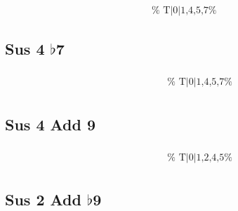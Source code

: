 \documentclass[english]{./gbook}
\begin{document}
\begin{large}
\[\begin{array}{ll}
&
	\text{
	}
\end{array}
\]

\subsection*{Sus 4 $\flat$7}

\[
\begin{array}{ll}
	\begin{array}{c}
		\begin{array}{ccc}
			&%
			&%
		\end{array}
		\\
		\begin{array}{cc}
			&%
		\end{array}
	\end{array}

&
	\text{
	}
\end{array}
\]

\subsection*{Sus 4 Add 9}

\[
\begin{array}{ll}
	\begin{array}{c}
		\begin{array}{ccc}
			&%
			&%
		\end{array}
		\\
		\begin{array}{cc}
			&%
		\end{array}
	\end{array}

&
	\text{
	}
\end{array}
\]

\subsection*{Sus 2 Add $\flat$9}

\[
\begin{array}{ll}
	\begin{array}{c}
		\begin{array}{ccc}
			&%
			&%
		\end{array}
		\\
		\begin{array}{cc}
			&%
		\end{array}
	\end{array}


\end{array}\]
\end{large}
\end{document}
